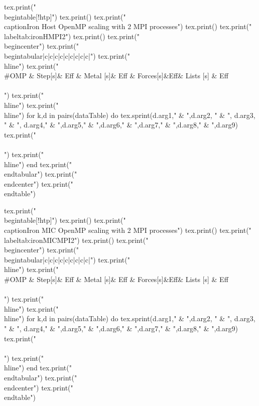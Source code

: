 \begin{luacode*}
  tex.print("\\begin{table}[!htp]")
  tex.print()
  tex.print("\\caption{Iron Host OpenMP scaling with 2 MPI processes}")
  tex.print()
  tex.print("\\label{tab:ironHMPI2}")
  tex.print()
  tex.print("\\begin{center}")
  tex.print("\\begin{tabular}{|c|c|c|c|c|c|c|c|c|}")
  tex.print("\\hline")
  tex.print("\\#OMP & Step[s]& Eff & Metal [s]& Eff & Forces[s]&Eff& Lists [s] & Eff\\\\")
  tex.print("\\hline")
  tex.print("\\hline")
  for k,d in pairs(dataTable) do
    tex.sprint(d.arg1," & ",d.arg2, " & ", d.arg3, " & ", d.arg4," & ",d.arg5," & ",d.arg6," & ",d.arg7," & ",d.arg8," & ",d.arg9)
    tex.print(" \\\\")
    tex.print("\\hline")
  end
  tex.print("\\end{tabular}")
  tex.print("\\end{center}")
  tex.print("\\end{table}")
\end{luacode*}
\begin{luacode*}
  tex.print("\\begin{table}[!htp]")
  tex.print()
  tex.print("\\caption{Iron MIC OpenMP scaling with 2 MPI processes}")
  tex.print()
  tex.print("\\label{tab:ironMICMPI2}")
  tex.print()
  tex.print("\\begin{center}")
  tex.print("\\begin{tabular}{|c|c|c|c|c|c|c|c|c|}")
  tex.print("\\hline")
  tex.print("\\#OMP & Step[s]& Eff & Metal [s]& Eff & Forces[s]&Eff& Lists [s] & Eff\\\\")
  tex.print("\\hline")
  tex.print("\\hline")
  for k,d in pairs(dataTable) do
    tex.sprint(d.arg1," & ",d.arg2, " & ", d.arg3, " & ", d.arg4," & ",d.arg5," & ",d.arg6," & ",d.arg7," & ",d.arg8," & ",d.arg9)
    tex.print(" \\\\")
    tex.print("\\hline")
  end
  tex.print("\\end{tabular}")
  tex.print("\\end{center}")
  tex.print("\\end{table}")
\end{luacode*}

